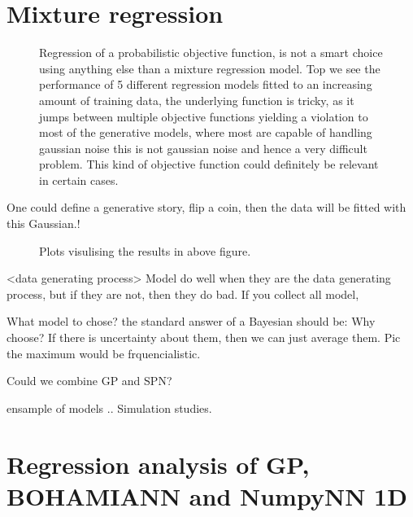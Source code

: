 \section{Mixture regression}

\begin{figure}
  \caption{Regression of a probabilistic objective function, is not a smart choice
  using anything else than a mixture regression model. Top we see the performance
  of 5 different regression models fitted to an increasing amount of training data, 
  the underlying function is tricky, as it jumps between multiple objective functions
  yielding a violation to most of the generative models, where most are capable of
  handling gaussian noise this is not gaussian noise and hence a very difficult problem. 
  This kind of objective function could definitely be relevant in certain cases.}
\end{figure}

One could define a generative story, flip a coin, then the data will
be fitted with this Gaussian.! 

\begin{figure}
  \caption{Plots visulising the results in above figure.}
\end{figure}

<data generating process>
Model do well when they are the data generating process, but if they are not, then
they do bad. If you collect all model, 

What model to chose? the standard answer of a Bayesian should be: Why choose? If there 
is uncertainty about them, then we can just average them. Pic the maximum would be frquencialistic.

Could we combine GP and SPN?

ensample of models ..
Simulation studies. 



\section{Regression analysis of GP, BOHAMIANN and NumpyNN 1D}

